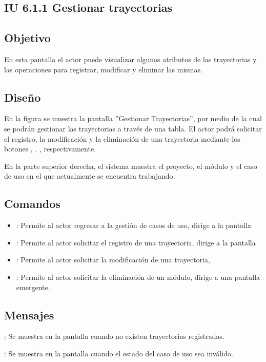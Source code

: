 \subsection{IU 6.1.1 Gestionar trayectorias}

\subsection{Objetivo}
	En esta pantalla el actor puede visualizar algunos atributos de las trayectorias y las operaciones para registrar, modificar y eliminar las mismas.
\subsection{Diseño}
	En la figura  se muestra la pantalla ''Gestionar Trayectorias'', por medio de la cual se podrán gestionar las trayectorias a través de una tabla. El actor podrá solicitar el registro, la modificación y la eliminación de una trayectoria mediante los botones , \editar, \eliminar, respectivamente.
	
	En la parte superior derecha, el sistema muestra el proyecto, el módulo y el caso de uso en el que actualmente se encuentra trabajando.

\subsection{Comandos}
\begin{itemize}
	\item {}: Permite al actor regresar a la gestión de casos de uso, dirige a la pantalla 
	\item {}: Permite al actor solicitar el registro de una trayectoria, dirige a la pantalla 
	\item \editar [Modificar]: Permite al actor solicitar la modificación de una trayectoria, 
	\item \eliminar [Eliminar]: Permite al actor solicitar la eliminación de un módulo, dirige a una pantalla emergente.
\end{itemize}

\subsection{Mensajes}

\begin{Citemize}
	\item {}: Se muestra en la pantalla  cuando no existen trayectorias registradas.
	\item {}: Se muestra en la pantalla  cuando el estado del caso de uso sea inválido.
\end{Citemize}
